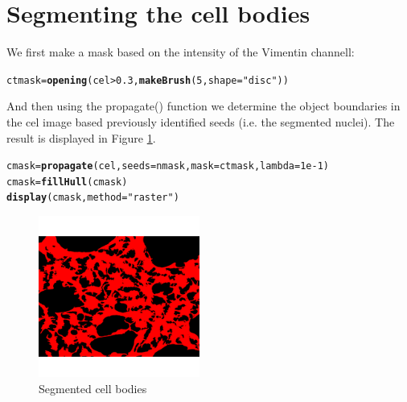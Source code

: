 \documentclass{article}\usepackage[]{graphicx}\usepackage[]{color}
\makeatletter
\newcommand{\hlnum}[1]{\textcolor[rgb]{0.686,0.059,0.569}{#1}}%
\newcommand{\hlstr}[1]{\textcolor[rgb]{0.192,0.494,0.8}{#1}}%
\newcommand{\hlopt}[1]{\textcolor[rgb]{0,0,0}{#1}}%
\newcommand{\hlstd}[1]{\textcolor[rgb]{0.345,0.345,0.345}{#1}}%
\newcommand{\hlkwb}[1]{\textcolor[rgb]{0.69,0.353,0.396}{#1}}%
\newcommand{\hlkwc}[1]{\textcolor[rgb]{0.333,0.667,0.333}{#1}}%
\newcommand{\hlkwd}[1]{\textcolor[rgb]{0.737,0.353,0.396}{\textbf{#1}}}%
\newenvironment{kframe}{%
 \def\at@end@of@kframe{}%
 \ifinner\ifhmode%
  \def\at@end@of@kframe{\end{minipage}}%
  \begin{minipage}{\columnwidth}%
 \fi\fi%
 \def\FrameCommand##1{\hskip\@totalleftmargin \hskip-\fboxsep
 \colorbox{shadecolor}{##1}\hskip-\fboxsep
     \hskip-\linewidth \hskip-\@totalleftmargin \hskip\columnwidth}%
 \MakeFramed {\advance\hsize-\width
   \@totalleftmargin\z@ \linewidth\hsize
   \@setminipage}}%
 {\par\unskip\endMakeFramed%
 \at@end@of@kframe}
\newenvironment{knitrout}{}{} %
\makeatother
\begin{document}
\section{Segmenting the cell bodies}
We first make a mask based on the intensity of the Vimentin channell:
\begin{knitrout}
\color{fgcolor}\begin{kframe}
\begin{alltt}
\hlstd{ctmask} \hlkwb{=} \hlkwd{opening}\hlstd{(cel}\hlopt{>}\hlnum{0.3}\hlstd{,} \hlkwd{makeBrush}\hlstd{(}\hlnum{5}\hlstd{,} \hlkwc{shape}\hlstd{=}\hlstr{"disc"}\hlstd{))}
\end{alltt}
\end{kframe}
\end{knitrout}
And then using the propagate() function we determine the object boundaries in the cel image based previously identified seeds (i.e. the segmented nuclei). The result is displayed in Figure \ref{fig:cmask}.
\begin{knitrout}
\color{fgcolor}\begin{kframe}
\begin{alltt}
\hlstd{cmask} \hlkwb{=} \hlkwd{propagate}\hlstd{(cel,} \hlkwc{seeds}\hlstd{=nmask,} \hlkwc{mask}\hlstd{=ctmask,} \hlkwc{lambda}\hlstd{=}\hlnum{1e-1}\hlstd{)}
\hlstd{cmask} \hlkwb{=} \hlkwd{fillHull}\hlstd{(cmask)}
\hlkwd{display}\hlstd{(cmask,} \hlkwc{method}\hlstd{=}\hlstr{"raster"}\hlstd{)}
\end{alltt}
\end{kframe}\begin{figure}

{\centering \includegraphics[width=200px]{knit_figure/figcmask-1} 

}

\caption[Segmented cell bodies]{Segmented cell bodies}\label{fig:cmask}
\end{figure}


\end{knitrout}
\end{document}
